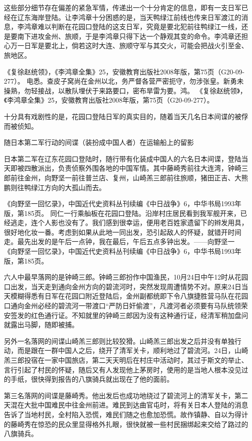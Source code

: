 \documentclass[12pt,UTF8]{ctexbook}
\begin{document}
这些部分细节存在偏差的紧急军情，传递出一个十分肯定的信息，即有一支日军已经在辽东海岸登陆。让李鸿章十分困惑的是，当天鸭绿江前线也传来日军渡江的消息，李鸿章难以判断在花园口登陆的这支日军，究竟是要北犯前往鸭绿江一线，还是要南下进攻金州、旅顺，于是李鸿章只得下达一个静观其变的命令。李鸿章还担心万一日军是要北上，倘若这时大连、旅顺守军与其交火，可能会把战火引至金、旅地区。

《复徐赵统领》，《李鸿章全集》25，安徽教育出版社2008年版，第75页（G20-09-277）。
电悉。查皮子窝尚在金州以北，务严督各营严密扼守，勿涉张皇。新勇未操熟，勿轻接战，以散队埋伏于来路要口，密布旱雷为要。鸿。 《复徐赵统领》，《李鸿章全集》25，安徽教育出版社2008年版，第75页（G20-09-277）。

十分具有戏剧性的是，花园口登陆日军的真实目的，随着当天几名日本间谍的被俘而被侦知。


随日本第二军行动的间谍（装扮成中国人者）在运输船上的留影

日本第二军在辽东花园口登陆时，随行带有化装成中国人的六名日本间谍，登陆当天即被四散派出，负责侦察外围各地的中国军情。其中藤崎秀前往大连湾，钟崎三郎前往金州，向野坚一前往普兰店、复州，山崎羔三郎前往旅顺，猪田正吉、大熊鹏则往鸭绿江方向的大孤山而去。

《向野坚一回忆录》，中国近代史资料丛刊续编《中日战争》6，中华书局1993年版，第185页。
同仁一行乘舢板在花园口登陆。沿岸村庄居民看到我军舰开来，已经逃走，连个人影也没有了。我们感到很幸运，便用老百姓家遗留下的辫发用具，很好地化妆一番。考虑到如果从此地一同出发，恐引起敌人的怀疑，就错开时间走。最先出发的是午后一点钟，我在最后，午后五点多钟出发。——向野坚一 《向野坚一回忆录》，中国近代史资料丛刊续编《中日战争》6，中华书局1993年版，第185页。

六人中最早落网的是钟崎三郎。钟崎三郎扮作中国渔民，10月24日中午12时从花园口出发，当天走到通向金州方向的碧流河时，突然发现周遭情势不对。原来24日当天模糊得悉有日军在花园口附近登陆后，金州副都统即下令八旗捷胜营马队在花园口通向金州必经的碧流河一带渡口“严防日奸偷渡”，凡渡河者必须要有马队统领荣安签发的红色通行证。不知就里的钟崎三郎因为没有这种通行证，经清军稍加盘问就露出马脚，随即被捕。

另外一名落网的间谍山崎羔三郎则比较狡猾。山崎羔三郎出发之后并没有单独行动，而是跟在一群中国人之后，绕开了清军关卡，顺利地过了碧流河。24日，山崎羔三郎投宿在一家中国旅店，第二天天明后在村庄中活动时，其过于斯文的举止、言行引起了村民的怀疑，随后又有人发现他上茅房时，使用的是当地人根本没见过的手纸，很快得到报告的八旗骑兵就出现在了他的面前。

第三名落网的间谍是藤崎秀。他出发后也成功地绕过了碧流河上的清军关卡，第二天混在大批中国难民中往金州前进。难民到达曲官屯时，将有关日本人登陆的消息告诉了当地村民，全村陷入恐慌，难民们随之也愈加恐慌。故作镇静、自以为得计的藤崎秀在惊恐的民众里显得格外扎眼，很快就被一些村民捆绑起来交给了路过的八旗骑兵。
\end{document}
